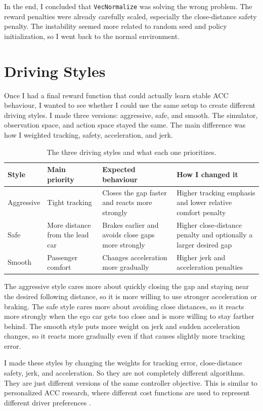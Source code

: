 \documentclass{article}
\begin{document}
In the end, I concluded that \texttt{VecNormalize} was solving the wrong problem. The reward penalties were already carefully scaled, especially the close-distance safety penalty. The instability seemed more related to random seed and policy initialization, so I went back to the normal environment.
\section{Driving Styles}

Once I had a final reward function that could actually learn stable ACC behaviour, I wanted to see whether I could use the same setup to create different driving styles. I made three versions: aggressive, safe, and smooth. The simulator, observation space, and action space stayed the same. The main difference was how I weighted tracking, safety, acceleration, and jerk.

\begin{table}[H]
\centering
\small
\begin{tabular}{p{}p{}p{}p{}}
\toprule
Style & Main priority & Expected behaviour & How I changed it \\
\midrule
Aggressive &
Tight tracking &
Closes the gap faster and reacts more strongly &
Higher tracking emphasis and lower relative comfort penalty \\
Safe &
More distance from the lead car &
Brakes earlier and avoids close gaps more strongly &
Higher close-distance penalty and optionally a larger desired gap \\
Smooth &
Passenger comfort &
Changes acceleration more gradually &
Higher jerk and acceleration penalties \\
\bottomrule
\end{tabular}
\caption{The three driving styles and what each one prioritizes.}
\label{tab:driving_styles}
\end{table}

The aggressive style cares more about quickly closing the gap and staying near the desired following distance, so it is more willing to use stronger acceleration or braking. The safe style cares more about avoiding close distances, so it reacts more strongly when the ego car gets too close and is more willing to stay farther behind. The smooth style puts more weight on jerk and sudden acceleration changes, so it reacts more gradually even if that causes slightly more tracking error.

I made these styles by changing the weights for tracking error, close-distance safety, jerk, and acceleration. So they are not completely different algorithms. They are just different versions of the same controller objective. This is similar to personalized ACC research, where different cost functions are used to represent different driver preferences \cite{ozkan2021personalized}.
\end{document}
